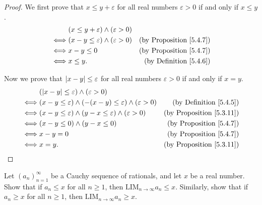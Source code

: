 \begin{proof}
We first prove that \(x \leq y + \varepsilon\) for all real numbers \(\varepsilon > 0\) if and only if \(x \leq y\).
\begin{align*}
& (x \leq y + \varepsilon) \land (\varepsilon > 0) \\
\iff & (x - y \leq \varepsilon) \land (\varepsilon > 0) & \text{(by Proposition \ref{5.4.7})} \\
\iff & x - y \leq 0 & \text{(by Proposition \ref{5.4.7})} \\
\iff & x \leq y. & \text{(by Definition \ref{5.4.6})}
\end{align*}

Now we prove that \(\abs*{x - y} \leq \varepsilon\) for all real numbers \(\varepsilon > 0\) if and only if \(x = y\).
\begin{align*}
& (\abs*{x - y} \leq \varepsilon) \land (\varepsilon > 0) \\
\iff & (x - y \leq \varepsilon) \land (-(x - y) \leq \varepsilon) \land (\varepsilon > 0) & \text{(by Definition \ref{5.4.5})} \\
\iff & (x - y \leq \varepsilon) \land (y - x \leq \varepsilon) \land (\varepsilon > 0) & \text{(by Proposition \ref{5.3.11})} \\
\iff & (x - y \leq 0) \land (y - x \leq 0) & \text{(by Proposition \ref{5.4.7})} \\
\iff & x - y = 0 & \text{(by Proposition \ref{5.4.7})} \\
\iff & x = y. & \text{(by Proposition \ref{5.3.11})}
\end{align*}
\end{proof}

\begin{exercise}\label{ex 5.4.8}
Let \((a_n)_{n = 1}^{\infty}\) be a Cauchy sequence of rationals, and let \(x\) be a real number.
Show that if \(a_n \leq x\) for all \(n \geq 1\), then \(\text{LIM}_{n \to \infty} a_n \leq x\).
Similarly, show that if \(a_n \geq x\) for all \(n \geq 1\), then \(\text{LIM}_{n \to \infty} a_n \geq x\).
\end{exercise}


